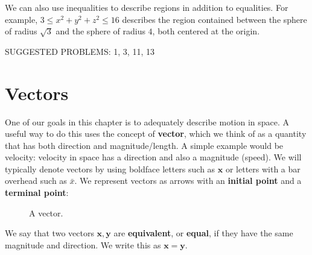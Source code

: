 \documentclass[10pt,]{book}
\newcommand{\terminology}[1]{\textbf{#1}}
\theoremstyle{ptxplainnotitle}
\theoremstyle{ptxplaintitle}
\theoremstyle{ptxplainnotitle}
\theoremstyle{ptxplaintitle}
\theoremstyle{ptxplainnotitle}
\theoremstyle{ptxplaintitle}
\theoremstyle{ptxdefinitionnotitle}
\theoremstyle{ptxdefinitiontitle}
\theoremstyle{ptxdefinitionnotitle}
\theoremstyle{ptxdefinitiontitle}
\theoremstyle{ptxdefinitionnotitle}
\theoremstyle{ptxdefinitiontitle}
\theoremstyle{ptxdefinitionnotitle}
\theoremstyle{ptxdefinitiontitle}
\theoremstyle{ptxdefinitionnotitle}
\theoremstyle{ptxdefinitiontitle}
\numberwithin{equation}{section}
\newcommand{\vv}[1]{\mathbf{#1}}
\begin{document}
\begin{example}\label{example-spherical-shells}
\hypertarget{p-737}{}%
We can also use inequalities to describe regions in addition to equalities. For example, \(3\leq x^{2}+y^{2}+z^{2}\leq 16\) describes the region contained between the sphere of radius \(\sqrt{3}\) and the sphere of radius \(4\), both centered at the origin.%
\end{example}
\hypertarget{p-738}{}%
SUGGESTED PROBLEMS: 1, 3, 11, 13%
\typeout{************************************************}
\typeout{************************************************}
\section[{Vectors}]{Vectors}\label{section-vectors}
\hypertarget{p-739}{}%
One of our goals in this chapter is to adequately describe motion in space. A useful way to do this uses the concept of \terminology{vector}, which we think of as a quantity that has both direction and magnitude/length. A simple example would be velocity: velocity in space has a direction and also a magnitude (speed). We will typically denote vectors by using boldface letters such as \(\vv{x}\) or letters with a bar overhead such as \(\bar{x}\). We represent vectors as arrows with an \terminology{initial point} and a \terminology{terminal point}:%
\begin{figure}
\centering
{
}
\caption{A vector.\label{figure-vector-representation}}
\end{figure}
\hypertarget{p-740}{}%
We say that two vectors \(\vv{x},\vv{y}\) are \terminology{equivalent}, or \terminology{equal}, if they have the same magnitude and direction. We write this as \(\vv{x} = \vv{y}\).%
\typeout{************************************************}
\typeout{************************************************}
\end{document}
